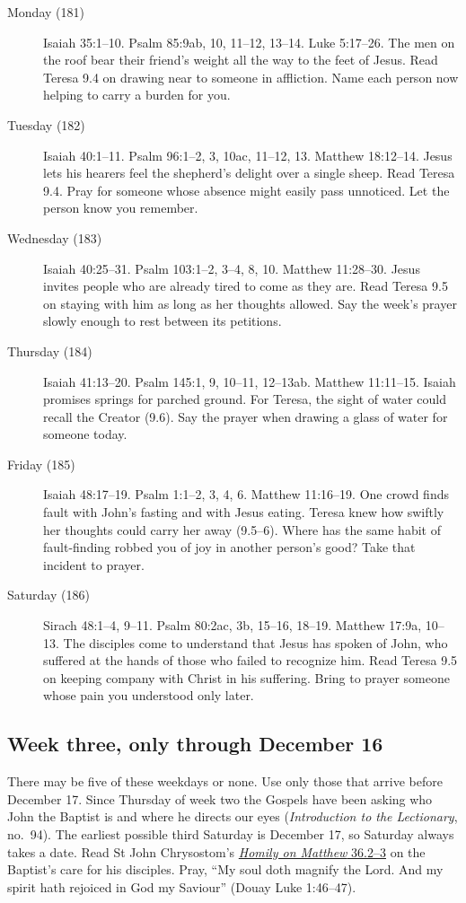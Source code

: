 \begin{description}
\item[Monday (181)] Isaiah 35:1--10. Psalm 85:9ab, 10, 11--12, 13--14.
Luke 5:17--26. The men on the roof bear their friend's weight all the way
to the feet of Jesus. Read Teresa 9.4 on drawing near to someone in
affliction. Name each person now helping to carry a burden for you.
\item[Tuesday (182)] Isaiah 40:1--11. Psalm 96:1--2, 3, 10ac, 11--12, 13.
Matthew 18:12--14. Jesus lets his hearers feel the shepherd's delight
over a single sheep. Read Teresa 9.4. Pray for someone whose absence
might easily pass unnoticed. Let the person know you remember.
\item[Wednesday (183)] Isaiah 40:25--31. Psalm 103:1--2, 3--4, 8, 10.
Matthew 11:28--30. Jesus invites people who are already tired to come
as they are. Read Teresa 9.5 on staying with him as long as her thoughts
allowed. Say the week's prayer slowly enough to rest between its petitions.
\item[Thursday (184)] Isaiah 41:13--20. Psalm 145:1, 9, 10--11, 12--13ab.
Matthew 11:11--15. Isaiah promises springs for parched ground.
For Teresa, the sight of water could recall the Creator (9.6).
Say the prayer when drawing a glass of water for someone today.
\item[Friday (185)] Isaiah 48:17--19. Psalm 1:1--2, 3, 4, 6.
Matthew 11:16--19. One crowd finds fault with John's fasting and
with Jesus eating. Teresa knew how swiftly her thoughts could carry
her away (9.5--6). Where has the same habit of fault-finding robbed
you of joy in another person's good? Take that incident to prayer.
\item[Saturday (186)] Sirach 48:1--4, 9--11. Psalm 80:2ac, 3b, 15--16,
18--19. Matthew 17:9a, 10--13. The disciples come to understand that
Jesus has spoken of John, who suffered at the hands of those who failed
to recognize him. Read Teresa 9.5 on keeping company with Christ in his
suffering. Bring to prayer someone whose pain you understood only later.
\end{description}

\subsection{Week three, only through December 16}

There may be five of these weekdays or none. Use only those that arrive
before December 17. Since Thursday of week two the Gospels have been
asking who John the Baptist is and where he directs our eyes
(\emph{Introduction to the Lectionary}, no.~94). The earliest possible third Saturday is December 17,
so Saturday always takes a date. Read St John Chrysostom's
\href{https://www.newadvent.org/fathers/200136.htm}{\emph{Homily on Matthew} 36.2--3}
on the Baptist's care for his disciples. Pray, “My soul doth magnify
the Lord. And my spirit hath rejoiced in God my Saviour” (Douay Luke
1:46--47).

